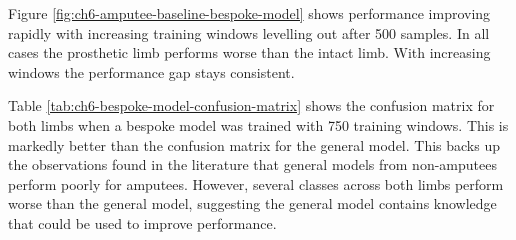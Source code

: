 Figure \ref{fig:ch6-amputee-baseline-bespoke-model} shows performance improving rapidly with increasing training windows levelling out after 500 samples. In all cases the prosthetic limb performs worse than the intact limb. With increasing windows the performance gap stays consistent.

Table \ref{tab:ch6-bespoke-model-confusion-matrix} shows the confusion matrix for both limbs when a bespoke model was trained with 750 training windows. This is markedly better than the confusion matrix for the general model. This backs up the observations found in the literature that general models from non-amputees perform poorly for amputees\cite{Lonini2016, Jamieson2021}. However, several classes across both limbs perform worse than the general model, suggesting the general model contains knowledge that could be used to improve performance.

